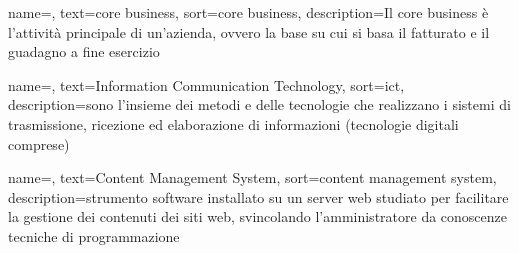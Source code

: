 
\renewcommand{\acronymname}{Acronimi e abbreviazioni}











\renewcommand{\glossaryname}{Glossario}

{
    name=,
    text=core business,
    sort=core business,
    description={Il core business è l'attività principale di un'azienda, ovvero la base su cui si basa il fatturato e il guadagno a fine esercizio}
}

{
		name=,
		text=Information Communication Technology,
		sort=ict,
		description={sono l'insieme dei metodi e delle tecnologie che realizzano i sistemi di trasmissione, ricezione ed elaborazione di informazioni (tecnologie digitali comprese)}
}

{
    name=,
    text=Content Management System,
    sort=content management system,
    description={strumento software installato su un server web studiato per facilitare la
gestione dei contenuti dei siti web, svincolando l’amministratore da conoscenze
tecniche di programmazione}
}

